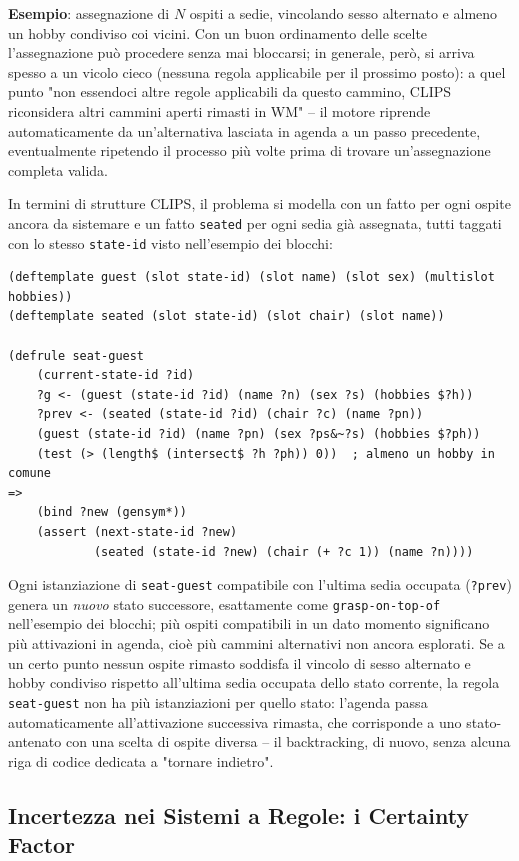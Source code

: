 \documentclass[a4paper,11pt]{article}
\begin{document}
\textbf{Esempio}: assegnazione di $N$ ospiti a sedie, vincolando sesso alternato e almeno un hobby condiviso coi vicini. Con un buon ordinamento delle scelte l'assegnazione può procedere senza mai bloccarsi; in generale, però, si arriva spesso a un vicolo cieco (nessuna regola applicabile per il prossimo posto): a quel punto "non essendoci altre regole applicabili da questo cammino, CLIPS riconsidera altri cammini aperti rimasti in WM" -- il motore riprende automaticamente da un'alternativa lasciata in agenda a un passo precedente, eventualmente ripetendo il processo più volte prima di trovare un'assegnazione completa valida.

In termini di strutture CLIPS, il problema si modella con un fatto per ogni ospite ancora da sistemare e un fatto \texttt{seated} per ogni sedia già assegnata, tutti taggati con lo stesso \texttt{state-id} visto nell'esempio dei blocchi:
\begin{lstlisting}
(deftemplate guest (slot state-id) (slot name) (slot sex) (multislot hobbies))
(deftemplate seated (slot state-id) (slot chair) (slot name))

(defrule seat-guest
    (current-state-id ?id)
    ?g <- (guest (state-id ?id) (name ?n) (sex ?s) (hobbies $?h))
    ?prev <- (seated (state-id ?id) (chair ?c) (name ?pn))
    (guest (state-id ?id) (name ?pn) (sex ?ps&~?s) (hobbies $?ph))
    (test (> (length$ (intersect$ ?h ?ph)) 0))  ; almeno un hobby in comune
=>
    (bind ?new (gensym*))
    (assert (next-state-id ?new)
            (seated (state-id ?new) (chair (+ ?c 1)) (name ?n))))
\end{lstlisting}
Ogni istanziazione di \texttt{seat-guest} compatibile con l'ultima sedia occupata (\texttt{?prev}) genera un \emph{nuovo} stato successore, esattamente come \texttt{grasp-on-top-of} nell'esempio dei blocchi; più ospiti compatibili in un dato momento significano più attivazioni in agenda, cioè più cammini alternativi non ancora esplorati. Se a un certo punto nessun ospite rimasto soddisfa il vincolo di sesso alternato e hobby condiviso rispetto all'ultima sedia occupata dello stato corrente, la regola \texttt{seat-guest} non ha più istanziazioni per quello stato: l'agenda passa automaticamente all'attivazione successiva rimasta, che corrisponde a uno stato-antenato con una scelta di ospite diversa -- il backtracking, di nuovo, senza alcuna riga di codice dedicata a "tornare indietro".

\subsection{Incertezza nei Sistemi a Regole: i Certainty Factor}
\end{document}

